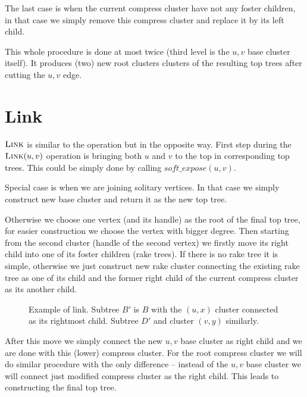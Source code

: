 The last case is when the current compress cluster have not any foster children,
in that case we simply remove this compress cluster and replace it by its left
child.

This whole procedure is done at most twice (third level is the $u,v$ base
cluster itself). It produces (two) new root clusters clusters of the resulting
top trees after cutting the $u,v$ edge.

\section{Link}

$\hbox{\sc Link}$ is similar to the \Cut{} operation but in the opposite way. First step
during the $\hbox{\sc Link}(u,v)$ operation is bringing both $u$ and $v$ to the top in
corresponding top trees. This could be simply done by calling
$soft\_expose(u,v)$.

Special case is when we are joining solitary vertices. In that case we simply
construct new base cluster and return it as the new top tree.

Otherwise we choose one vertex (and its handle) as the root of the final top tree,
for easier construction we choose the vertex with bigger degree. Then starting
from the second cluster (handle of the second vertex) we firstly move its right
child into one of its foster children (rake trees). If there is no rake tree it
is simple, otherwise we just construct new rake cluster connecting the existing
rake tree as one of its child and the former right child of the current compress
cluster as its another child.

\begin{figure}[h]
\centering
{}
\caption[Example of link]
{Example of link. Subtree $B'$ is $B$ with the $(u,x)$ cluster connected
as its rightmost child. Subtree $D'$ and cluster $(v,y)$ similarly.}
\end{figure}

After this move we simply connect the new $u,v$ base cluster as right child and we
are done with this (lower) compress cluster. For the root compress cluster we
will do similar procedure with the only difference -- instead of the $u,v$ base
cluster we will connect just modified compress cluster as the right child. This
leads to constructing the final top tree.
